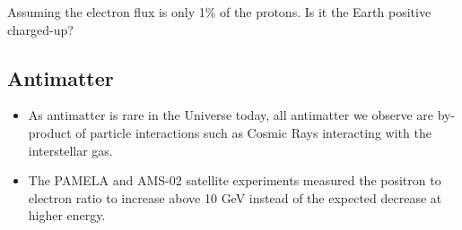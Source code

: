 \documentclass[
  letterpaper,
  DIV=11,
  numbers=noendperiod]{scrreprt}
\providecommand{\tightlist}{%
  \setlength{\itemsep}{0pt}\setlength{\parskip}{0pt}}\usepackage{longtable,booktabs,array}
\begin{document}
\begin{tcolorbox}[enhanced jigsaw, colframe=quarto-callout-note-color-frame, leftrule=.75mm, left=2mm, opacitybacktitle=0.6, colbacktitle=quarto-callout-note-color!10!white, coltitle=black, arc=.35mm, titlerule=0mm, toprule=.15mm, opacityback=0, bottomrule=.15mm, breakable, bottomtitle=1mm, rightrule=.15mm, toptitle=1mm, colback=white, title=\textcolor{quarto-callout-note-color}{\faInfo}\hspace{0.5em}{Question}]

Assuming the electron flux is only 1\% of the protons. Is it the Earth
positive charged-up?

\end{tcolorbox}

\subsection{Antimatter}\label{antimatter}

\begin{itemize}
\tightlist
\item
  As antimatter is rare in the Universe today, all antimatter we observe
  are by-product of particle interactions such as Cosmic Rays
  interacting with the interstellar gas.
\item
  The PAMELA and AMS-02 satellite experiments measured the positron to
  electron ratio to increase above 10 GeV instead of the expected
  decrease at higher energy.
\end{itemize}
\end{document}
